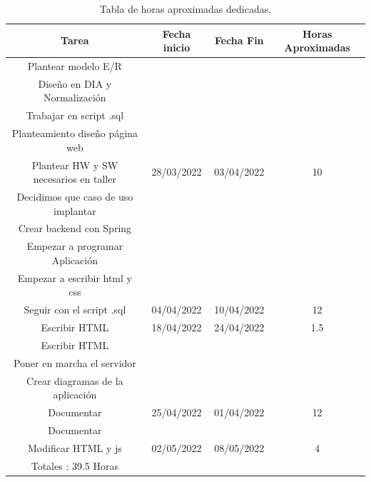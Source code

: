 \documentclass{article}
\begin{document}
\begin{table}[H]
  \begin{tabular}{c c c c}
    \hline
    Tarea & Fecha inicio & Fecha Fin & Horas Aproximadas \\
    \hline
    \hline
    Plantear modelo E/R \\ 
    Diseño en DIA y Normalización \\ 
    Trabajar en script .sql \\ 
    Planteamiento diseño página web \\
    Plantear HW y SW necesarios en taller & 28/03/2022 & 03/04/2022 & 10 \\ [1ex]
    \hline
    Decidimos que caso de uso implantar \\
    Crear backend con Spring \\ 
    Empezar a programar Aplicación \\
    Empezar a escribir html y css \\
    Seguir con el script .sql & 04/04/2022 & 10/04/2022 & 12 \\ 
    \hline 
    Escribir HTML & 18/04/2022 & 24/04/2022 & 1.5\\
    \hline 
    Escribir HTML \\
    Poner en marcha el servidor \\
    Crear diagramas de la aplicación \\
    Documentar & 25/04/2022 & 01/04/2022 & 12\\
    \hline 
    Documentar \\
    Modificar HTML y js & 02/05/2022 & 08/05/2022 & 4 \\
    \hline
    Totales : 39.5 Horas \\
    \hline
  \end{tabular}
  \caption{Tabla de horas aproximadas dedicadas.}
  \label{tab:horas}
\end{table}

\clearpage
\end{document}
